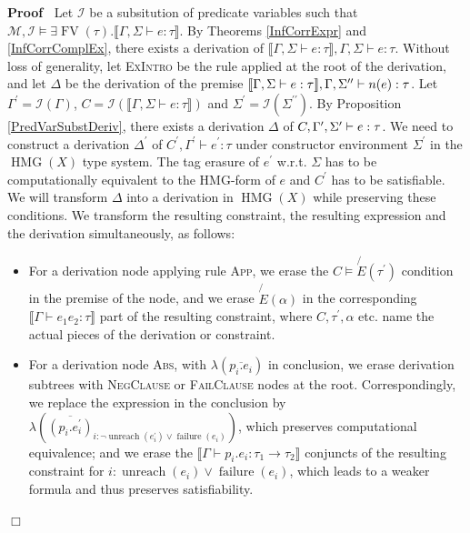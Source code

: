 \documentclass{article}
\newcommand{\tmname}[1]{\textsc{#1}}
\newcommand{\tmop}[1]{\ensuremath{\operatorname{#1}}}
\newenvironment{proof}{\noindent\textbf{Proof\ }}{\hspace*{\fill}$\Box$\medskip}
\begin{document}
\begin{proof}
  Let $\mathcal{I}$ be a subsitution of predicate variables such that
  $\mathcal{M}, \mathcal{I} \vDash \exists \tmop{FV} (\tau) . \llbracket
  \Gamma, \Sigma \vdash e : \tau \rrbracket$. By Theorems \ref{InfCorrExpr}
  and \ref{InfCorrComplEx}, there exists a derivation of $\llbracket \Gamma,
  \Sigma \vdash e : \tau \rrbracket, \Gamma, \Sigma \vdash e : \tau$. Without
  loss of generality, let {\tmname{ExIntro}} be the rule applied at the root
  of the derivation, and let $\Delta$ be the derivation of the premise
  $\llbracket \Gamma, \Sigma \vdash e : \tau \rrbracket, \Gamma,
  \Sigma^{\prime\prime} \vdash n (e) : {\nobreak} \tau$. Let $\Gamma^{\prime}
  =\mathcal{I} (\Gamma)$, $C =\mathcal{I} (\llbracket \Gamma, \Sigma \vdash e
  : \tau \rrbracket)$ and $\Sigma^{\prime} =\mathcal{I}
  (\Sigma^{\prime\prime})$. By Proposition \ref{PredVarSubstDeriv}, there
  exists a derivation $\Delta$ of $C, \Gamma^{\prime}, \Sigma^{\prime} \vdash
  e : {\nobreak} \tau$. We need to construct a derivation $\Delta^{\prime}$ of
  $C^{\prime}, \Gamma^{\prime} \vdash e^{\prime} : \tau$ under constructor
  environment $\Sigma^{\prime}$ in the $\tmop{HMG} (X)$ type system. The tag
  erasure of $e^{\prime}$ w.r.t. $\Sigma$ has to be computationally equivalent
  to the HMG-form of $e$ and $C^{\prime}$ has to be satisfiable. We will
  transform $\Delta$ into a derivation in $\tmop{HMG} (X)$ while preserving
  these conditions. We transform the resulting constraint, the resulting
  expression and the derivation simultaneously, as follows:
  \begin{itemize}
    \item For a derivation node applying rule {\tmname{App}}, we erase the $C
    \vDash \not{E} (\tau^{\prime})$ condition in the premise of the node, and
    we erase $\not{E} (\alpha)$ in the corresponding $\llbracket \Gamma \vdash
    e_1 e_2 : \tau \rrbracket$ part of the resulting constraint, where $C,
    \tau^{\prime}, \alpha$ etc. name the actual pieces of the derivation or
    constraint.
    
    \item For a derivation node {\tmname{Abs}}, with $\lambda (\overline{p_i
    .e_i})$ in conclusion, we erase derivation subtrees with
    {\tmname{NegClause}} or {\tmname{FailClause}} nodes at the root.
    Correspondingly, we replace the expression in the conclusion by $\lambda
    (\overline{(p_i .e_i^{\prime})}_{i : \neg \tmop{unreach} (e_i^{\prime})
    \vee \tmop{failure} (e_i)})$, which preserves computational equivalence;
    and we erase the $\llbracket \Gamma \vdash p_i .e_i : \tau_1 \rightarrow
    \tau_2 \rrbracket$ conjuncts of the resulting constraint for $i :
    \tmop{unreach} (e_i) \vee \tmop{failure} (e_i)$, which leads to a weaker
    formula and thus preserves satisfiability.
    

\end{itemize}
\end{proof}
\end{document}
